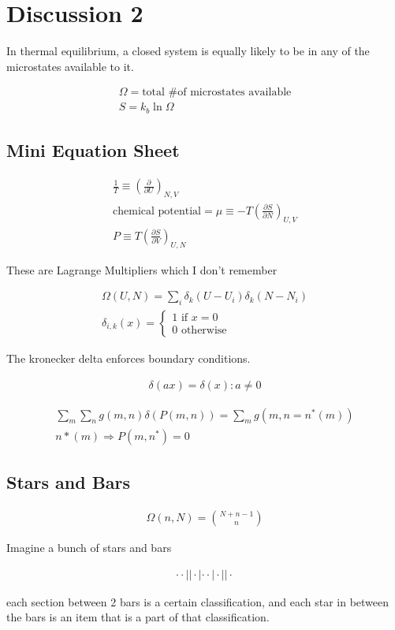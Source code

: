 \documentclass[fleqn]{report}
\newcommand{\del}{\partial}
\newcommand{\equations} [1] {
\begin{gather*}
#1
\end{gather*}
}
\begin{document}
\section{Discussion 2}
In thermal equilibrium, a closed system 
is equally likely to be in any of the microstates available 
to it. 

\equations{
    \Omega 
    =
    \textrm{total \# of microstates available}
    \\
    S = k_b \ln{\Omega}
}

\subsection{Mini Equation Sheet}
\equations{
    \frac{1}{T}
    \equiv 
    \left(
        \frac{\del}{\del U}
    \right)_{N, V}
    \\
    \textrm{chemical potential}
    =
    \mu
    \equiv
    -T \left(
        \frac{\del S}{\del N}
    \right)_{U, V}
    \\
    P 
    \equiv
    T \left(
        \frac{\del S}{\del V}
    \right)_{U, N}
}
These are Lagrange Multipliers which I don't remember 

\equations{
    \Omega(U, N)
    =
    \sum_i
    \delta_k(U - U_i)
    \delta_k(N - N_i)
    \\
    \delta_{i, k}(x)
    =
    \begin{cases}
        1 \textrm{ if } x = 0
        \\
        0 \textrm{ otherwise}
    \end{cases}
}
The kronecker delta enforces boundary conditions. 

\equations{
    \delta(ax)
    =
    \delta(x)
    :
    a \neq 0
}

\equations{
    \sum_m \sum_n
    g(m, n)
    \delta(P(m, n))
    =
    \sum_m
    g(m, n = n^*(m))
    \\
    n*(m)
    \Rightarrow 
    P(m, n^*) 
    =
    0
}

\subsection{Stars and Bars}
\equations{
    \Omega(n, N)
    =
    {N + n - 1 \choose n}
}

Imagine a bunch of stars and bars 
\equations{
    \cdot 
    \cdot 
    ||
    \cdot 
    |
    \cdot 
    \cdot 
    |
    \cdot 
    ||
    \cdot 
}

each section between 2 bars is a certain classification, and each star 
in between the bars is an item that is a part of that classification. 
\end{document}
